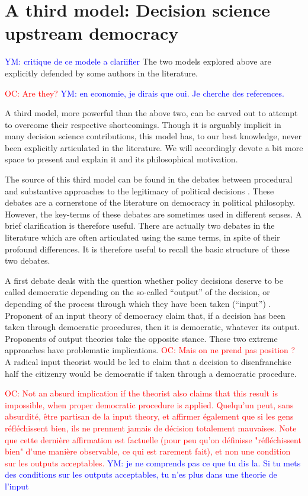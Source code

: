\documentclass[preprint,11pt]{elsarticle}
\newcommand{\commentYM}[1]{\textcolor{blue}{YM: #1}}
\newcommand{\commentOC}[1]{\textcolor{red}{OC: #1}}
\begin{document}
\section{A third model: Decision science upstream democracy}
\commentYM{critique de ce modele a clariifier}
\noindent The two models explored above are explicitly defended by some authors in the literature. 

\commentOC{ Are they?}
\commentYM{en economie, je dirais que oui. Je cherche des references.} 

A third model, more powerful than the above two, can be carved out to attempt to overcome their respective shortcomings. Though it is arguably implicit in many decision science contributions, this model has, to our best knowledge, never been explicitly articulated in the literature. We will accordingly devote a bit more space to present and explain it and its philosophical motivation.

The source of this third model can be found in the debates between procedural and substantive approaches to the legitimacy of political decisions \cite{meinard_what_2017}. These debates are a cornerstone of the literature on democracy in political philosophy. However, the key-terms of these debates are sometimes used in different senses. A brief clarification is therefore useful. There are actually two debates in the literature which are often articulated using the same terms, in spite of their profound differences. It is therefore useful to recall the basic structure of these two debates.

A first debate deals with the question whether policy decisions deserve to be called democratic depending on the so-called “output” of the decision, or depending of the process through which they have been taken (“input”) \cite{vatn_environmental_2016, backstrand_environmental_2010}. Proponent of an input theory of democracy claim that, if a decision has been taken through democratic procedures, then it is democratic, whatever its output. Proponents of output theories take the opposite stance. These two extreme approaches have problematic implications. \commentOC{Mais on ne prend pas position ?} A radical input theorist would be led to claim that a decision to disenfranchise half the citizenry would be democratic if taken through a democratic procedure. 

\commentOC{Not an absurd implication if the
theorist also claims that this result is impossible, when
proper democratic procedure is applied. Quelqu’un peut, sans absurdité, être partisan de la input theory, et affirmer également que si les gens réfléchissent bien, ils ne prennent jamais de décision totalement mauvaises. Note que cette dernière affirmation est factuelle (pour peu qu’on définisse "réfléchissent bien" d’une manière observable, ce qui est rarement fait), et non une condition sur les outputs acceptables. }
\commentYM{je ne comprends pas ce que tu dis la. Si tu mets des conditions sur les outputs acceptables, tu n'es plus dans une theorie de l'input}
\end{document}
